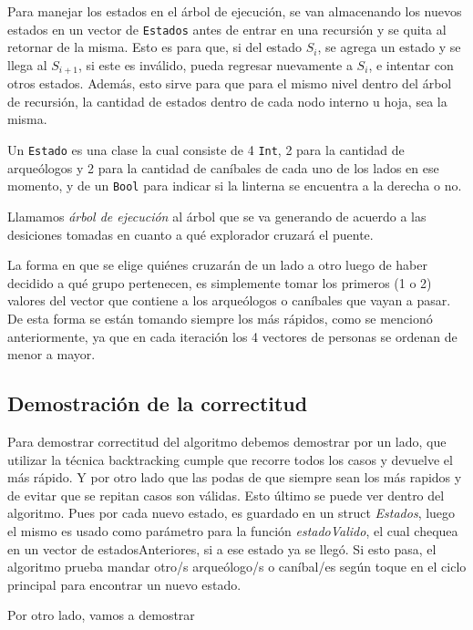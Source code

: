             Para manejar los estados en el árbol de ejecución, se van almacenando los nuevos estados en un vector de \texttt{Estados} antes de entrar en una recursión y se quita al retornar de la misma. Esto es para que, si del estado $S_{i}$, se agrega un estado y se llega al $S_{i+1}$, si este es inválido, pueda regresar nuevamente a $S_{i}$, e intentar con otros estados. Además, esto sirve para que para el mismo nivel dentro del árbol de recursión, la cantidad de estados dentro de cada nodo interno u hoja, sea la misma.

            Un \texttt{Estado} es una clase la cual consiste de 4 \texttt{Int}, 2 para la cantidad de arqueólogos y 2 para la cantidad de caníbales de cada uno de los lados en ese momento, y de un \texttt{Bool} para indicar si la linterna se encuentra a la derecha o no.

            Llamamos \emph{árbol de ejecución} al árbol que se va generando de acuerdo a las desiciones tomadas en cuanto a qué explorador cruzará el puente.

            La forma en que se elige quiénes cruzarán de un lado a otro luego de haber decidido a qué grupo pertenecen, es simplemente tomar los primeros (1 o 2) valores del vector que contiene a los arqueólogos o caníbales que vayan a pasar. De esta forma se están tomando siempre los más rápidos, como se mencionó anteriormente, ya que en cada iteración los 4 vectores de personas se ordenan de menor a mayor.


    \subsection{Demostración de la correctitud}
      Para demostrar correctitud del algoritmo debemos demostrar por un lado, que utilizar la técnica backtracking cumple que recorre todos los casos y devuelve el más rápido. Y por otro lado que las podas de que siempre sean los más rapidos y de evitar que se repitan casos son válidas.
      Esto último se puede ver dentro del algoritmo. Pues por cada nuevo estado, es guardado en un struct \emph{Estados}, luego el mismo es usado como parámetro para la función \emph{estadoValido}, el cual chequea en un vector de estadosAnteriores, si a ese estado ya se llegó. Si esto pasa, el algoritmo prueba mandar otro/s arqueólogo/s o caníbal/es según toque en el ciclo principal para encontrar un nuevo estado.\par

      Por otro lado, vamos a demostrar  




